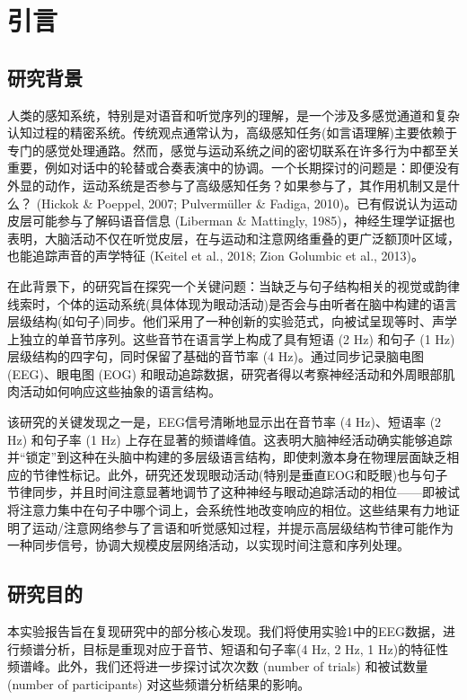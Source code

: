 \documentclass[jou,12pt,floatsintext]{apa7} %
\begin{document}
\section{引言}

\subsection{\heiti 研究背景}

人类的感知系统，特别是对语音和听觉序列的理解，是一个涉及多感觉通道和复杂认知过程的精密系统。传统观点通常认为，高级感知任务(如言语理解)主要依赖于专门的感觉处理通路。然而，感觉与运动系统之间的密切联系在许多行为中都至关重要，例如对话中的轮替或合奏表演中的协调。一个长期探讨的问题是：即便没有外显的动作，运动系统是否参与了高级感知任务？如果参与了，其作用机制又是什么？ (Hickok \& Poeppel, 2007; Pulvermüller \& Fadiga, 2010)。已有假说认为运动皮层可能参与了解码语音信息 (Liberman \& Mattingly, 1985)，神经生理学证据也表明，大脑活动不仅在听觉皮层，在与运动和注意网络重叠的更广泛额顶叶区域，也能追踪声音的声学特征 (Keitel et al., 2018; Zion Golumbic et al., 2013)。

在此背景下，\textcite{jin2018eye}的研究旨在探究一个关键问题：当缺乏与句子结构相关的视觉或韵律线索时，个体的运动系统(具体体现为眼动活动)是否会与由听者在脑中构建的语言层级结构(如句子)同步。他们采用了一种创新的实验范式，向被试呈现等时、声学上独立的单音节序列。这些音节在语言学上构成了具有短语 (2 Hz) 和句子 (1 Hz) 层级结构的四字句，同时保留了基础的音节率 (4 Hz)。通过同步记录脑电图 (EEG)、眼电图 (EOG) 和眼动追踪数据，研究者得以考察神经活动和外周眼部肌肉活动如何响应这些抽象的语言结构。

该研究的关键发现之一是，EEG信号清晰地显示出在音节率 (4 Hz)、短语率 (2 Hz) 和句子率 (1 Hz) 上存在显著的频谱峰值。这表明大脑神经活动确实能够追踪并“锁定”到这种在头脑中构建的多层级语言结构，即使刺激本身在物理层面缺乏相应的节律性标记。此外，研究还发现眼动活动(特别是垂直EOG和眨眼)也与句子节律同步，并且时间注意显著地调节了这种神经与眼动追踪活动的相位——即被试将注意力集中在句子中哪个词上，会系统性地改变响应的相位。这些结果有力地证明了运动/注意网络参与了言语和听觉感知过程，并提示高层级结构节律可能作为一种同步信号，协调大规模皮层网络活动，以实现时间注意和序列处理。


\subsection{\heiti 研究目的}

本实验报告旨在复现\textcite{jin2018eye}研究中的部分核心发现。我们将使用实验1中的EEG数据，进行频谱分析，目标是重现对应于音节、短语和句子率(4 Hz, 2 Hz, 1 Hz)的特征性频谱峰。此外，我们还将进一步探讨试次次数 (number of trials) 和被试数量 (number of participants) 对这些频谱分析结果的影响。
\end{document}
